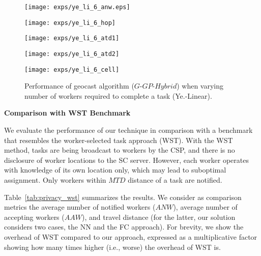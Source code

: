 \documentclass{USC-Thesis}
\numberwithin{equation}{chapter}
\begin{document}
\begin{figure*}[tbh]
	\begin{minipage}[b]{0.195\linewidth}
	\centering
		\texttt{[image: exps/ye\_li\_6\_anw.eps]}
		\label{fig:ye_li_6_anw}
	\end{minipage}
	\begin{minipage}[b]{0.195\linewidth}
	\centering
		\texttt{[image: exps/ye\_li\_6\_hop]}
		\label{fig:ye_li_6_hop}
	\end{minipage}
	\begin{minipage}[b]{0.195\linewidth}
	\centering
		\texttt{[image: exps/ye\_li\_6\_atd1]}
		\label{fig:ye_li_6_atd1}
	\end{minipage}	
	\begin{minipage}[b]{0.195\linewidth}
	\centering
		\texttt{[image: exps/ye\_li\_6\_atd2]}
		\label{fig:ye_li_6_atd2}
	\end{minipage}
	\begin{minipage}[b]{0.195\linewidth}
		\centering
		\texttt{[image: exps/ye\_li\_6\_cell]}
		\label{fig:ye_li_6_cell}
	\end{minipage}
	\caption{Performance of geocast algorithm ($G$-$\mathit{GP}$-$\mathit{Hybrid}$) when varying number of workers required to complete a task (Ye.-Linear).}
\label{fig:varying_k}
\end{figure*}

\textbf{Comparison with WST Benchmark}

We evaluate the performance of our technique in comparison with a benchmark that resembles the worker-selected task approach (WST). With the WST method, tasks are being broadcast to workers by the CSP, and there is no disclosure of worker locations to the SC server. However, each worker operates with knowledge of its own location only, which may lead to suboptimal assignment. Only workers within $MTD$ distance of a task are notified.

Table~\ref{tab:privacy_wst} summarizes the results. We consider as comparison metrics the average number of notified workers ($ANW$), average number of accepting workers ($AAW$), and travel distance (for the latter, our solution considers two cases, the NN and the FC approach). For brevity, we show the overhead of WST compared to our approach, expressed as a multiplicative factor showing how many times higher (i.e., worse) the overhead of WST is.
\end{document}
